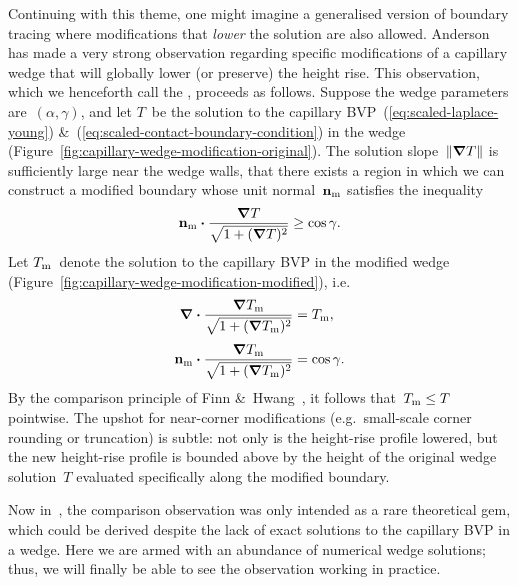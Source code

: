 Continuing with this theme,
one might imagine a generalised version of boundary tracing
where modifications that \emph{lower} the solution are also allowed.
Anderson~\cite[Section~7.3.2]{anderson-2002-thesis-boundary-tracing-pdes}
has made a very strong observation
regarding specific modifications of a capillary wedge
that will globally lower (or preserve) the height rise.
This observation,
which we henceforth call the ,
proceeds as follows.
Suppose the wedge parameters are~$(\alpha, \gamma)$,
and let $T$~be the solution
to the capillary BVP~(\ref{eq:scaled-laplace-young})
\&~(\ref{eq:scaled-contact-boundary-condition})
in the wedge (Figure~\ref{fig:capillary-wedge-modification-original}).
The solution slope~$\lVert\mathop{}\!\boldsymbol{\mathbf{\nabla}} T\rVert$
is sufficiently large near the wedge walls,
that there exists a region in which we can construct a modified boundary
whose unit normal~$\mathop{}\!\boldsymbol{\mathbf{n}}_{\mathrm{m}}$ satisfies the inequality
\begin{equation}
  \mathop{}\!\boldsymbol{\mathbf{n}}_{\mathrm{m}} \boldsymbol{\cdot} \frac{\mathop{}\!\boldsymbol{\mathbf{\nabla}} T}{\sqrt{1 + (\mathop{}\!\boldsymbol{\mathbf{\nabla}} T)^2}} \ge \cos\gamma.
  \label{eq:modification-contact-boundary-condition-inequality}
\end{equation}
Let $T_{\mathrm{m}}$~denote the solution to the capillary BVP
in the modified wedge (Figure~\ref{fig:capillary-wedge-modification-modified}),
i.e.
\begin{align}
  \del \dotp \frac{\del T_\modi}{\sqrt{1 + (\del T_\modi)^2}}
    &= T_\modi,
    \label{eq:modification-laplace-young}
    \\[\tallspace]
  \normalvec_\modi \dotp \frac{\del T_\modi}{\sqrt{1 + (\del T_\modi)^2}}
    &= \cos\gamma.
    \label{eq:modification-contact-boundary-condition}
\end{align}
By the comparison principle
of Finn \&~Hwang~\cite{finn-1989-comparison-principle-capillary-surfaces},
it follows that~$T_{\mathrm{m}} \le T$ pointwise.
The upshot for near-corner modifications
(e.g.~small-scale corner rounding or truncation)
is subtle:
not only is the height-rise profile lowered,
but the new height-rise profile is bounded above
by the height of the original wedge solution~$T$
evaluated specifically along the modified boundary.

Now in~\cite{anderson-2002-thesis-boundary-tracing-pdes},
the comparison observation was only intended as a rare theoretical gem,
which could be derived despite the lack of exact solutions
to the capillary BVP in a wedge.
Here we are armed with an abundance of numerical wedge solutions;
thus, we will finally be able to see the observation working in practice.

